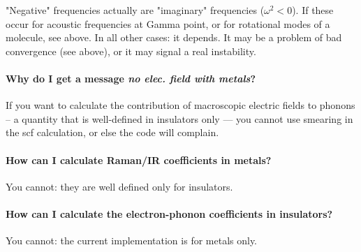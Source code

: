 \documentclass[12pt,a4paper]{article}
\begin{document}
"Negative" frequencies actually are "imaginary" frequencies 
($\omega^2<0$). If these occur for acoustic frequencies at Gamma point, 
or for rotational modes of a molecule, see above.
In all other cases: it depends. It may be a problem of bad
convergence (see above), or it may signal a real instability.

\paragraph{Why do I get a message {\em no elec. field with metals}? }

If you want to calculate the contribution of macroscopic electric 
fields to phonons -- a quantity that is well-defined in insulators 
only --- you cannot use smearing in the scf calculation, or else the
code will complain. 

\paragraph{How can I calculate Raman/IR coefficients in metals?}

You cannot: they are well defined only for insulators.

\paragraph{How can I calculate the electron-phonon coefficients
in insulators?}

You cannot: the current implementation is for metals only.
\end{document}
